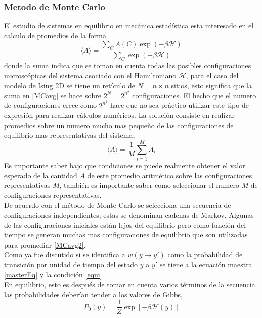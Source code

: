 \documentclass[a4paper]{article}
\begin{document}
\subsubsection{Metodo de Monte Carlo}
El estudio de sistemas en equilibrio en mecánica estadística  esta interesado en el calculo de promedios de la forma
\begin{equation}\label{MCavg}
\langle A\rangle=\frac{\displaystyle \sum_{C} A(C) \exp(-\beta\mathcal{H})}{\displaystyle\sum_{C} \exp(-\beta\mathcal{H})}
\end{equation}
donde  la suma indica que se toman en cuenta todas las posibles configuraciones microscópicas del sistema asociado con el Hamiltoniano $\mathcal{H}$, para el caso del modelo de Ising 2D se tiene un retículo de $N=n\times n$ sitios, esto significa que la suma en \ref{MCavg} se hace sobre $2^N=2^{n^2}$ configuraciones. El hecho que el numero de configuraciones crece como $2^{n^2}$ hace que no sea práctico utilizar este tipo de expresión para realizar cálculos numéricos. La solución consiste en realizar promedios sobre un numero mucho mas pequeño de las configuraciones de equilibrio mas representativas  del sistema,
\begin{equation}\label{MCavg2}
\langle A\rangle=\frac{1}{M}\sum^M_{i=1}A_i
\end{equation}
Es importante saber bajo que condiciones se puede realmente obtener el valor esperado de la cantidad $A$ de este promedio aritmético sobre las configuraciones representativas $M$, también es importante saber como seleccionar el numero $M$ de configuraciones representativas. \\
De acuerdo con el método de Monte Carlo se selecciona una secuencia de configuraciones independientes, estas se denominan cadenas de Markov. Algunas de las configuraciones iniciales están lejos del equilibrio pero como función del tiempo se generan muchas mas configuraciones de equilibrio que son utilizadas para promediar \ref{MCavg2}.\\
Como ya fue discutido si se identifica a $w(y\rightarrow y')$ como la probabilidad de transición por unidad de tiempo del estado $y$ a $y'$ se tiene a la ecuación maestra \ref{masterEq} y la condición \ref{equi}.\\
En equilibrio, esto es después de tomar en cuenta varios términos de la secuencia las probabilidades deberían tender a los valores de Gibbs,
\begin{equation}
P_0(y)=\frac{1}{Z}\exp[-\beta\mathcal{H}(y)]
\end{equation}
\end{document}
